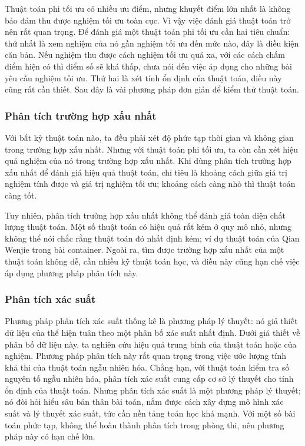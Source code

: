 \documentclass[11pt]{article}
\begin{document}
Thuật toán phi tối ưu có nhiều ưu điểm, nhưng khuyết điểm lớn nhất là không
bảo đảm thu được nghiệm tối ưu toàn cục. Vì vậy việc đánh giá thuật toán trở
nên rất quan trọng. Để đánh giá một thuật toán phi tối ưu cần hai tiêu chuẩn:
thứ nhất là xem nghiệm của nó gần nghiệm tối ưu đến mức nào, đây là điều kiện
căn bản. Nếu nghiệm thu được cách nghiệm tối ưu quá xa, với các cách chấm điểm
hiện có thì điểm số sẽ khá thấp, chưa nói đến việc áp dụng cho những bài yêu
cầu nghiệm tối ưu. Thứ hai là xét tính ổn định của thuật toán, điều này cũng
rất cần thiết. Sau đây là vài phương pháp đơn giản để kiểm thử thuật toán.

\subsubsection{Phân tích trường hợp xấu nhất}

Với bất kỳ thuật toán nào, ta đều phải xét độ phức tạp thời gian và không gian
trong trường hợp xấu nhất. Nhưng với thuật toán phi tối ưu, ta còn cần xét
hiệu quả nghiệm của nó trong trường hợp xấu nhất. Khi dùng phân tích trường
hợp xấu nhất để đánh giá hiệu quả thuật toán, chỉ tiêu là khoảng cách giữa giá
trị nghiệm tính được và giá trị nghiệm tối ưu; khoảng cách càng nhỏ thì thuật
toán càng tốt.

Tuy nhiên, phân tích trường hợp xấu nhất không thể đánh giá toàn diện chất
lượng thuật toán. Một số thuật toán có hiệu quả rất kém ở quy mô nhỏ, nhưng
không thể nói chắc rằng thuật toán đó nhất định kém; ví dụ thuật toán của
Qian Wenjie trong bài container. Ngoài ra, tìm được trường hợp xấu nhất của
một thuật toán không dễ, cần nhiều kỹ thuật toán học, và điều này cũng hạn chế
việc áp dụng phương pháp phân tích này.

\subsubsection{Phân tích xác suất}

Phương pháp phân tích xác suất thống kê là phương pháp lý thuyết: nó giả thiết
dữ liệu của thể hiện tuân theo một phân bố xác suất nhất định. Dưới giả thiết
về phân bố dữ liệu này, ta nghiên cứu hiệu quả trung bình của thuật toán hoặc
của nghiệm. Phương pháp phân tích này rất quan trọng trong việc ước lượng tính
khả thi của thuật toán ngẫu nhiên hóa. Chẳng hạn, với thuật toán kiểm tra số
nguyên tố ngẫu nhiên hóa, phân tích xác suất cung cấp cơ sở lý thuyết cho tính
ổn định của thuật toán. Nhưng phân tích xác suất là một phương pháp lý thuyết;
nó đòi hỏi hiểu sâu bản thân bài toán, nắm được cách xây dựng mô hình xác suất
và lý thuyết xác suất, tức cần nền tảng toán học khá mạnh. Với một số bài toán
phức tạp, không thể hoàn thành phân tích trong phòng thi, nên phương pháp này
có hạn chế lớn.
\end{document}
